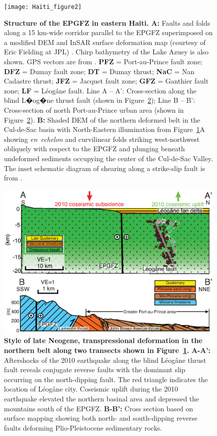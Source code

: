 \documentclass[linenumbers,draft]{agujournal}
\begin{document}
\begin{figure}
\centering
\texttt{[image: Haiti\_figure2]}
\caption{\textbf{Structure of the EPGFZ in eastern Haiti. A:} Faults and folds along a 15 km-wide corridor parallel to the EPGFZ superimposed on a modified DEM and InSAR surface deformation map (courtesy of Eric Fielding at JPL) \citep{hayes2010complex}. Chirp bathymetry of the Lake Azuey is also shown. GPS vectors are from \citet{calais2010transpressional}. \textbf{PFZ} = Port-au-Prince fault zone; \textbf{DFZ} = Dumay fault zone; \textbf{DT} = Dumay thrust; \textbf{NaC} = Nan Cadastre thrust; \textbf{JFZ} = Jacquet fault zone; \textbf{GFZ} = Ganthier fault zone; \textbf{LF} = L\'eog\^ane fault. Line A -- A': Cross-section along the blind L�og�ne thrust fault (shown in Figure~\ref{figure3}); Line B -- B': Cross-section of north Port-au-Prince urban area (shown in Figure~\ref{figure3}). \textbf{B:} Shaded DEM of the northern deformed belt in the Cul-de-Sac basin with North-Eastern illumination from Figure~\ref{figure2}A showing \textit{en~echelon} and curvilinear folds striking west-northwest obliquely with respect to the EPGFZ and plunging beneath undeformed sediments occupying the center of the Cul-de-Sac Valley. The inset schematic diagram of shearing along a strike-slip fault is from \citet{odonne1983analogue}.}
\label{figure2}
\end{figure}

\begin{figure}
\centering
\includegraphics[width=\textwidth]{Haiti_figure3}
\caption{\textbf{Style of late Neogene, transpressional deformation in the northern belt along two transects shown in Figure~\ref{figure2}.} \textbf{A-A':} Aftershocks of the 2010 earthquake \citep{douilly2013crustal,douilly2015three} along the blind L\'eog\^ane thrust fault reveals conjugate reverse faults with the dominant slip occurring on the north-dipping fault. The red triangle indicates the location of L\'eog\^ane city. Coseismic uplift during the 2010 earthquake elevated the northern basinal area and depressed the mountains south of the EPGFZ. \textbf{B-B':} Cross section based on surface mapping \citep{massoni1955haiti,cox2011shear,mchugh2011offshore,saint2015seismotectonics} showing both north- and south-dipping reverse faults deforming Plio-Pleistocene sedimentary rocks.}
\label{figure3}
\end{figure}
\end{document}
